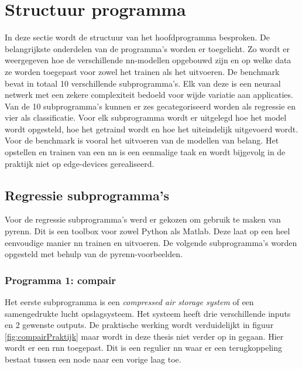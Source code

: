 \newpage

\section{Structuur programma} 
In deze sectie wordt de structuur van het hoofdprogramma besproken. De belangrijkste onderdelen van de programma's worden er toegelicht. Zo wordt er weergegeven hoe de verschillende \gls{nn}-modellen opgebouwd zijn en op welke data ze worden toegepast voor zowel het trainen als het uitvoeren. De benchmark bevat in totaal 10 verschillende subprogramma's. Elk van deze is een neuraal netwerk met een zekere complexiteit bedoeld voor wijde variatie aan applicaties. Van de 10 subprogramma's kunnen er zes gecategoriseerd worden als regressie en vier als classificatie. Voor elk subprogramma wordt er uitgelegd hoe het model wordt opgesteld, hoe het getraind wordt en hoe het uiteindelijk uitgevoerd wordt. Voor de benchmark is vooral het uitvoeren van de modellen van belang. Het opstellen en trainen van een \gls{nn} is een eenmalige taak en wordt bijgevolg in de praktijk niet op edge-devices gerealiseerd.


	\subsection{Regressie subprogramma's} \label{subsec:regrsubprog}
	Voor de regressie subprogramma's werd er gekozen om gebruik te maken van pyrenn. Dit is een toolbox voor zowel Python als Matlab. Deze laat op een heel eenvoudige manier \gls{nn} trainen en uitvoeren. De volgende subprogramma's worden opgesteld met behulp van de pyrenn-voorbeelden. 

		\subsubsection{Programma 1: compair}
		Het eerste subprogramma is een \textit{compressed air storage system} of een samengedrukte lucht opslagsysteem. Het systeem heeft drie verschillende inputs en 2 gewenste outputs. De praktische werking wordt verduidelijkt in figuur \ref{fig:compairPraktijk} maar wordt in deze thesis niet verder op in gegaan. Hier wordt er een \gls{rnn} toegepast. Dit is een regulier \gls{nn} waar er een terugkoppeling bestaat tussen een node naar een vorige laag toe. 
			
